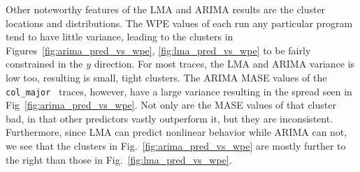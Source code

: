 \documentclass{article}
\newcommand{\col}{{\tt col\_major}~}
\begin{document}
Other noteworthy features of the LMA and ARIMA results are the cluster locations
and distributions. The WPE values of each run any particular program tend to
have little variance, leading to the clusters in
Figures~\ref{fig:arima_pred_vs_wpe}, \ref{fig:lma_pred_vs_wpe} to be fairly
constrained in the $y$ direction. For most traces, the LMA and ARIMA variance is
low too, resulting is small, tight clusters. The ARIMA MASE values of the \col
traces, however, have a large variance resulting in the spread seen in
Fig~\ref{fig:arima_pred_vs_wpe}. Not only are the MASE values of that cluster
bad, in that other predictors vastly outperform it, but they are inconsistent.
Furthermore, since LMA can predict nonlinear behavior while ARIMA can not, we
see that the clusters in Fig.~\ref{fig:arima_pred_vs_wpe} are mostly further to
the right than those in Fig.~\ref{fig:lma_pred_vs_wpe}.















 

\end{document}
